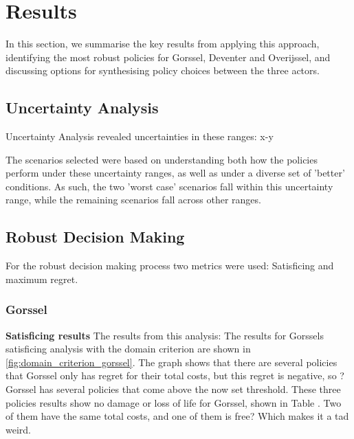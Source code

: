 \section{Results}
\label{s:results}

In this section, we summarise the key results from applying this approach, identifying the most robust policies for Gorssel, Deventer and Overijssel, and discussing options for synthesising policy choices between the three actors.


\subsection{Uncertainty Analysis}
Uncertainty Analysis revealed uncertainties in these ranges: x-y

The scenarios selected were based on understanding both how the policies perform under these uncertainty ranges, as well as under a diverse set of 'better' conditions. As such, the two 'worst case' scenarios fall within this uncertainty range, while the remaining scenarios fall across other ranges.


\subsection{Robust Decision Making}
For the robust decision making process two metrics were used: Satisficing and maximum regret. 
\subsubsection{Gorssel}
\textbf{Satisficing results} \newline
The results from this analysis: The results for Gorssels satisficing analysis with the domain criterion are shown in \autoref{fig:domain_criterion_gorssel}. The graph shows that there are several policies that 
Gorssel only has regret for their total costs, but this regret is negative, so ?
Gorssel has several policies that come above the now set threshold. These three policies results show no damage or loss of life for Gorssel, shown in Table . Two of them have the same total costs, and one of them is free? Which makes it a tad weird. 


